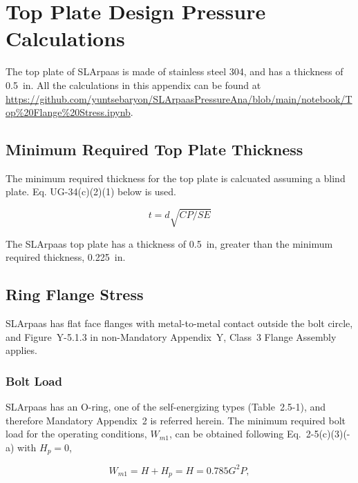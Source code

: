 \section{Top Plate Design Pressure Calculations}
\label{app:top_plate}

The top plate of SLArpaas is made of stainless steel 304, and has
a thickness of 0.5~in.
All the calculations in this appendix can be found
at \url{https://github.com/yuntsebaryon/SLArpaasPressureAna/blob/main/notebook/Top%20Flange%20Stress.ipynb}.

\subsection{Minimum Required Top Plate Thickness}
\label{app:blind_flange}

The minimum required thickness for the top plate is calcuated assuming
a blind plate.  Eq. UG-34(c)(2)(1) below is used.

\begin{equation}
    t= d\sqrt{CP/SE}
\end{equation}



The SLArpaas top plate has a thickness of 0.5~in, greater than the minimum
required thickness, 0.225~in.

\subsection{Ring Flange Stress}
\label{app:ring_flange}

SLArpaas has flat face flanges with metal-to-metal contact outside the bolt
circle, and Figure~Y-5.1.3 in non-Mandatory Appendix~Y, Class~3 Flange Assembly
applies.

\subsubsection{Bolt Load}
\label{app:bolt_load}

SLArpaas has an O-ring, one of the self-energizing types (Table~2.5-1),
and therefore Mandatory Appendix~2 is referred herein.
The minimum required bolt load for the operating conditions,
$W_{m1}$, can be obtained following Eq.~2-5(c)(3)(-a) with $H_p = 0$,

\begin{equation}
    W_{m1} = H + H_p = H = 0.785G^2 P,
\end{equation}

